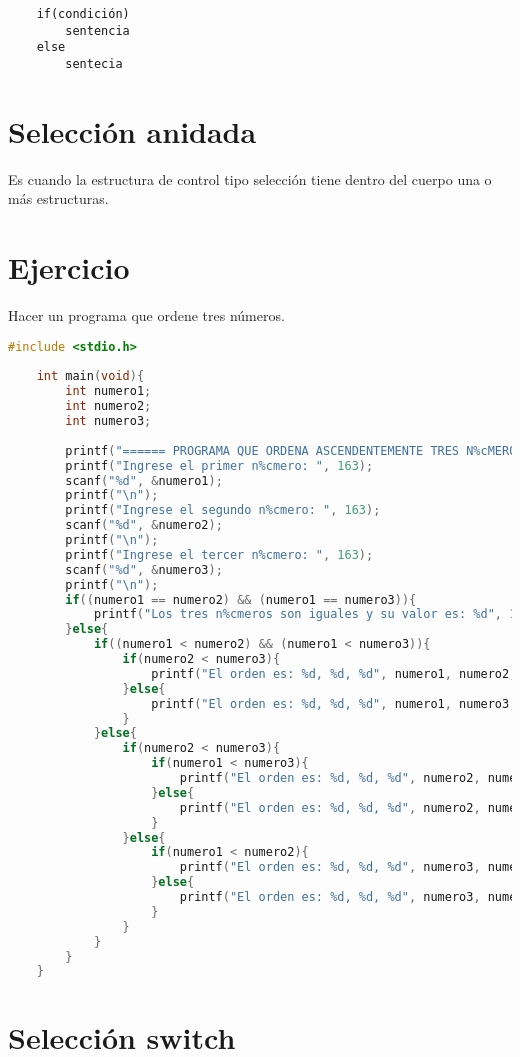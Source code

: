 \begin{verbatim}
	if(condición)
		sentencia
	else
		sentecia
\end{verbatim}

\section [Selección anidada]{Selección anidada}
Es cuando la estructura de control tipo selección tiene dentro del cuerpo una o más estructuras.

\section [Ejercicio]{Ejercicio}
Hacer un programa que ordene tres números.

\begin{lstlisting}[language=C, caption={Ordena tres números de forma ascendente}, style=codigoenc]
	#include <stdio.h>
	
	int main(void){
		int numero1;
		int numero2;
		int numero3;
		
		printf("====== PROGRAMA QUE ORDENA ASCENDENTEMENTE TRES N%cMEROS ======\n\n", 223);
		printf("Ingrese el primer n%cmero: ", 163);
		scanf("%d", &numero1);
		printf("\n");
		printf("Ingrese el segundo n%cmero: ", 163);
		scanf("%d", &numero2);
		printf("\n");
		printf("Ingrese el tercer n%cmero: ", 163);
		scanf("%d", &numero3);
		printf("\n");
		if((numero1 == numero2) && (numero1 == numero3)){
			printf("Los tres n%cmeros son iguales y su valor es: %d", 163, numero1);
		}else{
			if((numero1 < numero2) && (numero1 < numero3)){
				if(numero2 < numero3){
					printf("El orden es: %d, %d, %d", numero1, numero2, numero3);
				}else{
					printf("El orden es: %d, %d, %d", numero1, numero3, numero2);
				}
			}else{
				if(numero2 < numero3){
					if(numero1 < numero3){
						printf("El orden es: %d, %d, %d", numero2, numero1, numero3);	
					}else{
						printf("El orden es: %d, %d, %d", numero2, numero3, numero1);
					}
				}else{
					if(numero1 < numero2){
						printf("El orden es: %d, %d, %d", numero3, numero1, numero2);
					}else{
						printf("El orden es: %d, %d, %d", numero3, numero2, numero1);
					}	
				}
			}
		}
	}
\end{lstlisting}

\section [Selección switch]{Selección switch}

